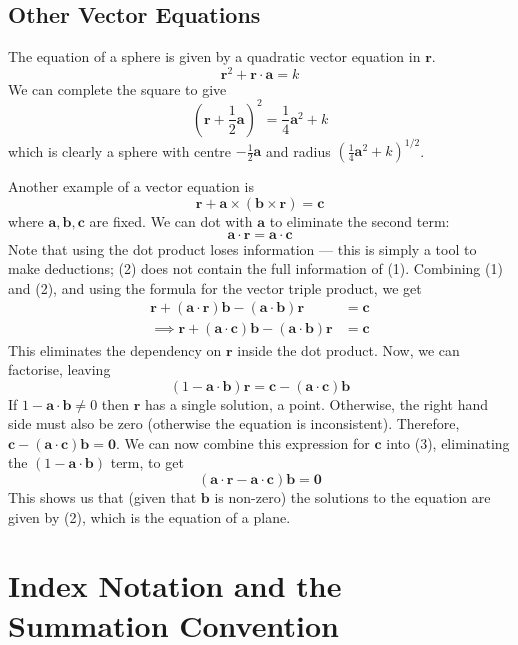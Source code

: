 \documentclass{article}
\begin{document}
	\subsection{Other Vector Equations}
	The equation of a sphere is given by a quadratic vector equation in $\bm r$.
	\[ \bm r^2 + \bm r \cdot \bm a = k \]
	We can complete the square to give
	\[ \left(\bm r + \frac 1 2 \bm a \right)^2 = \frac 1 4 \bm a^2 + k \]
	which is clearly a sphere with centre $-\frac 1 2 \bm a$ and radius $\left( \frac 1 4 \bm a^2 + k \right)^{1/2}$.
	
	Another example of a vector equation is
	\[ \bm r + \bm a \times (\bm b \times \bm r) = \bm c \tag{1} \]
	where $\bm a, \bm b, \bm c$ are fixed. We can dot with $\bm a$ to eliminate the second term:
	\[ \bm a \cdot \bm r = \bm a \cdot \bm c \tag{2} \]
	Note that using the dot product loses information --- this is simply a tool to make deductions; (2) does not contain the full information of (1). Combining (1) and (2), and using the formula for the vector triple product, we get
	\begin{align*}
		\bm r + (\bm a \cdot \bm r) \bm b - (\bm a \cdot \bm b) \bm r &= \bm c \tag{3} \\
		\implies \bm r + (\bm a \cdot \bm c) \bm b - (\bm a \cdot \bm b) \bm r &= \bm c
	\end{align*}
	This eliminates the dependency on $\bm r$ inside the dot product. Now, we can factorise, leaving
	\[ (1 - \bm a \cdot \bm b) \bm r = \bm c - (\bm a \cdot \bm c) \bm b \tag{4} \]
	If $1 - \bm a \cdot \bm b \neq 0$ then $\bm r$ has a single solution, a point. Otherwise, the right hand side must also be zero (otherwise the equation is inconsistent). Therefore, $\bm c - (\bm a \cdot \bm c)\bm b = \bm 0$. We can now combine this expression for $\bm c$ into (3), eliminating the $(1- \bm a \cdot \bm b)$ term, to get
	\[ (\bm a \cdot \bm r - \bm a \cdot \bm c) \bm b = \bm 0 \]
	This shows us that (given that $\bm b$ is non-zero) the solutions to the equation are given by (2), which is the equation of a plane.
	
	\section{Index Notation and the Summation Convention}
\end{document}
